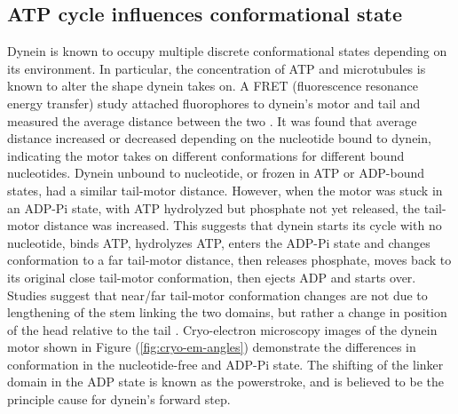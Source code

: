 \documentclass[
11pt, %
english, %
singlespacing, %
headsepline, %
chapterinoneline, %
]{MastersDoctoralThesis} %
\begin{document}
\subsection{ATP cycle influences conformational state}
Dynein is known to occupy multiple discrete conformational states depending on its environment. In particular, the concentration of ATP and microtubules is known to alter the shape dynein takes on. A FRET (fluorescence resonance energy transfer) study attached fluorophores to dynein's motor and tail and measured the average distance between the two \cite{FRETstatepaper}. It was found that average distance increased or decreased depending on the nucleotide bound to dynein, indicating the motor takes on different conformations for different bound nucleotides. Dynein unbound to nucleotide, or frozen in ATP or ADP-bound states, had a similar tail-motor distance. However, when the motor was stuck in an ADP-Pi state, with ATP hydrolyzed but phosphate not yet released, the tail-motor distance was increased. This suggests that dynein starts its cycle with no nucleotide, binds ATP, hydrolyzes ATP, enters the ADP-Pi state and changes conformation to a far tail-motor distance, then releases phosphate, moves back to its original close tail-motor conformation, then ejects ADP and starts over.\\

Studies suggest that near/far tail-motor conformation changes are not due to lengthening of the stem linking the two domains, but rather a change in position of the head relative to the tail \cite{FRETstatepaper, burgess-paper}. Cryo-electron microscopy images of the dynein motor shown in Figure (\ref{fig:cryo-em-angles}) demonstrate the differences in conformation in the nucleotide-free and ADP-Pi state. The shifting of the linker domain in the ADP state is known as the powerstroke, and is believed to be the principle cause for dynein's forward step.\\
\end{document}
